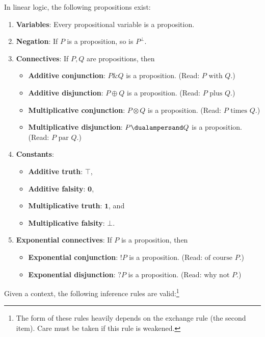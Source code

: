     In linear logic, the following propositions exist:
    \begin{enumerate}
        \item\textbf{Variables}: Every propositional variable is a proposition.
        \item\textbf{Negation}: If $P$ is a proposition, so is $P^\perp$.
        \item\textbf{Connectives}: If $P,Q$ are propositions, then
            \begin{itemize}
                \item\textbf{Additive conjunction}: $P\& Q$ is a proposition. (Read: $P\text{ with }Q$.)
                \item\textbf{Additive disjunction}: $P\oplus Q$ is a proposition. (Read: $P\text{ plus }Q$.)
                \item\textbf{Multiplicative conjunction}: $P\otimes Q$ is a proposition. (Read: $P\text{ times }Q$.)
                \item\textbf{Multiplicative disjunction}: $P\dualampersand Q$ is a proposition. (Read: $P\text{ par }Q$.)
            \end{itemize}
        \item\textbf{Constants}:
            \begin{itemize}
                \item\textbf{Additive truth}: $\top$,
                \item\textbf{Additive falsity}: $\symbf{0}$,
                \item\textbf{Multiplicative truth}: $\symbf{1}$, and
                \item\textbf{Multiplicative falsity}: $\bot$.
            \end{itemize}
        \item\textbf{Exponential connectives}: If $P$ is a proposition, then
            \begin{itemize}
                \item\textbf{Exponential conjunction}: $!P$ is a proposition. (Read: $\text{of course }P$.)
                \item\textbf{Exponential disjunction}: $?P$ is a proposition. (Read: $\text{why not }P$.)
            \end{itemize}
    \end{enumerate}
    Given a context, the following inference rules are valid:\footnote{The form of these rules heavily depends on the exchange rule (the second item). Care must be taken if this rule is weakened.}

